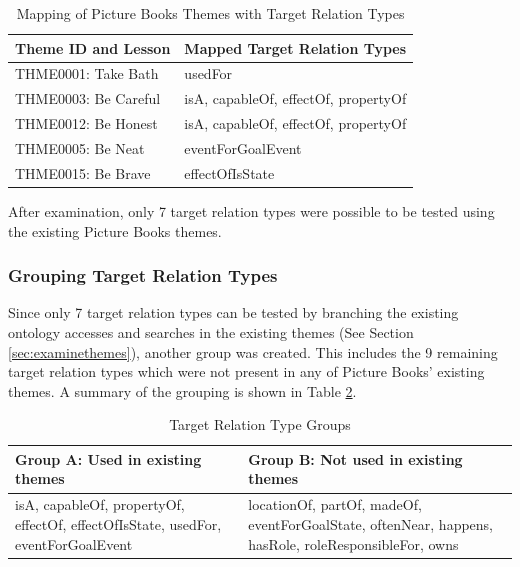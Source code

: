 \begin{table}[H]   %
\centering
\caption{Mapping of Picture Books Themes with Target Relation Types} \vspace{0.25em}
\begin{tabular}{|p{5cm}|p{5cm}|} \hline
\textbf{Theme ID and Lesson} & \textbf{Mapped Target Relation Types} \\ \hline
THME0001: Take Bath			& usedFor \\ \hline
THME0003: Be Careful		& isA, capableOf, effectOf, propertyOf \\ \hline
THME0012: Be Honest			& isA, capableOf, effectOf, propertyOf \\ \hline
THME0005: Be Neat			& eventForGoalEvent \\ \hline
THME0015: Be Brave			& effectOfIsState \\ \hline
\end{tabular}
\label{tab:mapthemerel}
\end{table}  

After examination, only 7 target relation types were possible to be tested using the existing Picture Books themes.

\subsubsection{Grouping Target Relation Types}
\label{sec:grouprel}

Since only 7 target relation types can be tested by branching the existing ontology accesses and searches in the existing themes (See Section \ref{sec:examinethemes}), another group was created. This includes the 9 remaining target relation types which were not present in any of Picture Books' existing themes. A summary of the grouping is shown in Table \ref{tab:relgroups}.

\begin{table}[H]   %
\centering
\caption{Target Relation Type Groups} \vspace{0.25em}
\begin{tabular}{|p{5cm}|p{5cm}|} \hline
\textbf{Group A: Used in existing themes} & \textbf{Group B: Not used in existing themes} \\ \hline
isA, capableOf, propertyOf, effectOf, effectOfIsState, usedFor, eventForGoalEvent	& locationOf, partOf, madeOf, eventForGoalState, oftenNear, happens, hasRole, roleResponsibleFor, owns \\ \hline
\end{tabular}
\label{tab:relgroups}
\end{table}

